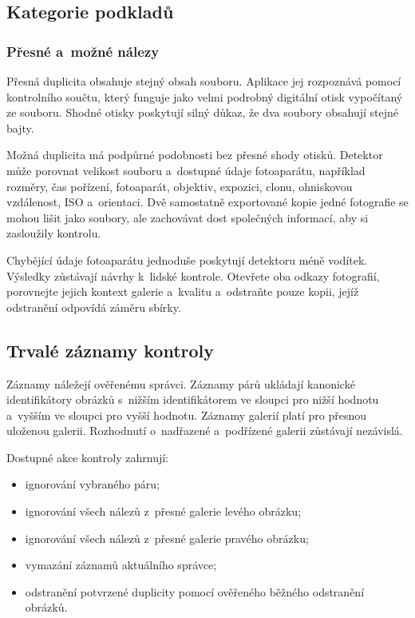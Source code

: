 \documentclass[11pt,a4paper]{article}
\begin{document}
\subsection{Kategorie podkladů}

\subsubsection{Přesné a~možné nálezy}

Přesná duplicita obsahuje stejný obsah souboru. Aplikace jej rozpoznává pomocí
kontrolního součtu, který funguje jako velmi podrobný digitální otisk vypočítaný
ze souboru. Shodné otisky poskytují silný důkaz, že dva soubory obsahují stejné
bajty.

Možná duplicita má podpůrné podobnosti bez přesné shody otisků. Detektor může
porovnat velikost souboru a~dostupné údaje fotoaparátu, například rozměry, čas
pořízení, fotoaparát, objektiv, expozici, clonu, ohniskovou vzdálenost, ISO
a~orientaci. Dvě samostatně exportované kopie jedné fotografie se mohou lišit
jako soubory, ale zachovávat dost společných informací, aby si zasloužily
kontrolu.

Chybějící údaje fotoaparátu jednoduše poskytují detektoru méně vodítek. Výsledky
zůstávají návrhy k~lidské kontrole. Otevřete oba odkazy fotografií, porovnejte
jejich kontext galerie a~kvalitu a~odstraňte pouze kopii, jejíž odstranění
odpovídá záměru sbírky.

\subsection{Trvalé záznamy kontroly}

Záznamy náležejí ověřenému správci. Záznamy párů ukládají kanonické
identifikátory obrázků s~nižším identifikátorem ve sloupci pro nižší hodnotu
a~vyšším ve sloupci pro vyšší hodnotu. Záznamy galerií platí pro přesnou
uloženou galerii. Rozhodnutí o~nadřazené a~podřízené galerii zůstávají
nezávislá.

Dostupné akce kontroly zahrnují:

\begin{itemize}
  \item ignorování vybraného páru;
  \item ignorování všech nálezů z~přesné galerie levého obrázku;
  \item ignorování všech nálezů z~přesné galerie pravého obrázku;
  \item vymazání záznamů aktuálního správce;
  \item odstranění potvrzené duplicity pomocí ověřeného běžného odstranění
  obrázků.
\end{itemize}
\end{document}
